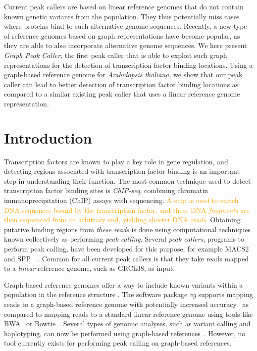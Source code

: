 \documentclass[10pt,letterpaper]{article}
\newcommand{\revision}[1]{\textcolor{orange}{#1}}
\begin{document}
Current peak callers are based on linear reference genomes that do not contain known genetic variants from the population.
They thus potentially miss cases where proteins bind to such alternative genome sequences.
Recently, a new type of reference genomes based on graph representations have become popular, as they are able to also incorporate alternative genome sequences.
We here present \emph{Graph Peak Caller}, the first peak caller that is able to exploit such graph representations for the detection of transcription factor binding locations.
Using a graph-based reference genome for \emph{Arabidopsis thaliana}, we show that our peak caller can lead to better detection of transcription factor binding locations as compared to a similar existing peak caller that uses a linear reference genome representation.

\linenumbers

\section*{Introduction}
Transcription factors are known to play a key role in gene regulation, and detecting regions associated with transcription factor binding is an important step in understanding their function. The most common technique used to detect transcription factor binding sites is \emph{ChIP-seq}, combining chromatin immunoprecipitation (ChIP) assays with sequencing. \revision{A chip is used to enrich DNA-sequences bound by the transcription factor, and these DNA \emph{fragments} are then sequenced from an arbitrary end, yielding shorter DNA \emph{reads}.} Obtaining putative binding regions from \emph{these reads} is done using computational techniques known collectively as performing \emph{peak calling}. Several \emph{peak callers}, programs to perform peak calling, have been developed for this purpose, for example MACS2~\cite{macs} and SPP~\cite{spp}~\cite{peak_caller_review}. Common for all current peak callers is that they take reads mapped to a \emph{linear} reference genome, such as GRCh38, as input. 

Graph-based reference genomes offer a way to include known variants within a population in the reference structure \cite{graph_evolution}. The software package \emph{vg} supports mapping reads to a graph-based reference genome with potentially increased accuracy~\cite{vg, genome_graphs} as compared to mapping reads to a standard linear reference genome using tools like BWA~\cite{bwa_mem} or Bowtie~\cite{bowtie}.
Several types of genomic analyses, such as variant calling and haplotyping, can now be performed using graph-based references~\cite{vg, genome_graphs}. However, no tool currently exists for performing peak calling on graph-based references. 
\end{document}

